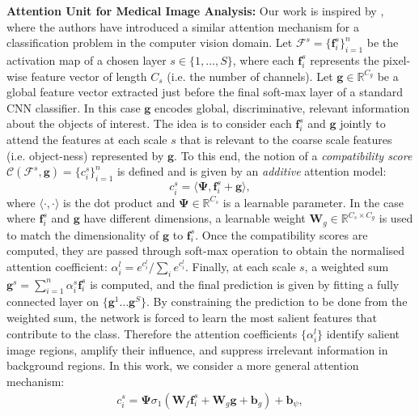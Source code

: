 \documentclass{article}
\providecommand{\mb}[1]{\mathbf{#1}}
\providecommand{\mbb}[1]{\boldsymbol{#1}}
\begin{document}
\textbf{Attention Unit for Medical Image Analysis:} Our work is inspired by \cite{jetley2018learn}, where the authors have introduced a similar attention mechanism for a classification problem in the computer vision domain. Let $\mathcal{F}^s = \{ \mb{f}_i^{s} \}_{i=1}^n$ be the activation map of a chosen layer $s\in \{1, \dots, S\}$, where each $\mb{f}_i^{s}$ represents the pixel-wise feature vector of length $C_s$ (i.e. the number of channels). Let $\mb{g} \in \mathbb{R}^{C_g}$ be a global feature vector extracted just before the final soft-max layer of a standard CNN classifier. In this case $\mb{g}$ encodes global, discriminative, relevant information about the objects of interest. The idea is to consider each $\mb{f}_i^{s}$ and $\mb{g}$ jointly to attend the features at each scale $s$ that is relevant to the coarse scale features (i.e. object-ness) represented by $\mb{g}$. To this end, the notion of a \emph{compatibility score} $\mathcal{C}(\mathcal{F}^s, \mb{g}) = \{c_i^s\}_{i=1}^n$ is defined and is given by an \emph{additive} attention model:
\begin{equation}
c_i^s = \langle \mbb{\Psi}, \mb{f}_i^s + \mb{g} \rangle ,
\end{equation}
where  $\langle\cdot,\cdot\rangle$ is the dot product and $\mbb{\Psi} \in \mathbb{R}^{C_s}$ is a learnable parameter. In the case where $\mb{f}_i^s$ and $\mb{g}$ have different dimensions, a learnable weight $\mb{W}_g \in \mathbb{R}^{C_s \times C_g}$ is used to match the dimensionality of $\mb{g}$ to $\mb{f}_i^s$. Once the compatibility scores are computed, they are passed through soft-max operation to obtain the normalised attention coefficient: $\alpha_i^l = e^{c_i^l}/\sum_i e^{c_i^l}$. Finally, at each scale $s$, a  weighted sum $\mb{g}^s = \sum_{i=1}^n \alpha_i^s \mb{f}_i^s$ is computed, and the final prediction is given by fitting a fully connected layer on $\{\mb{g}^1 \dots \mb{g}^S\}$. By constraining the prediction to be done from the weighted sum, the network is forced to learn the most salient features that contribute to the class. Therefore the attention coefficients $\{\alpha_i^l\}$ identify salient image regions, amplify their influence, and suppress irrelevant information in background regions. In this work, we consider a more general attention mechanism:
\begin{gather}
c_i^s = \mbb{\Psi} \sigma_1 \left(\mb{W}_f \mb{f}_i^s + \mb{W}_g \mb{g} + \mb{b}_g \right) + \mb{b}_\psi ,
\end{gather}
\end{document}
